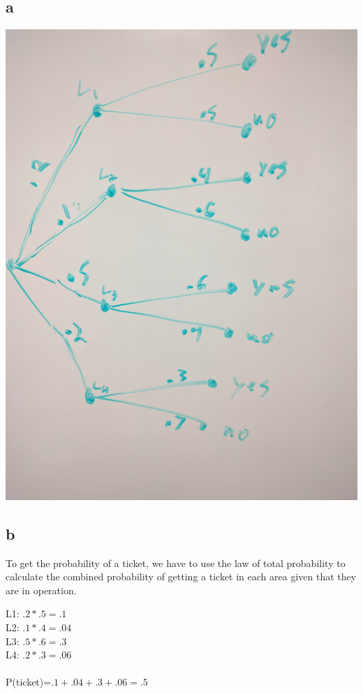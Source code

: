 \documentclass[10pt,letterpaper]{article}
\begin{document}
\subsection*{a}
\includegraphics[scale=.075]{tree}

\subsection*{b}
To get the probability of a ticket, we have to use the law of total probability
to calculate the combined probability of getting a ticket in each area given
that they are in operation.

\noindent L1: $ .2*.5=.1 $\\
L2: $ .1*.4=.04 $\\
L3: $ .5*.6=.3 $\\
L4: $ .2*.3=.06 $\\
\\
P(ticket)=$ .1+.04+.3+.06=.5$
\end{document}
